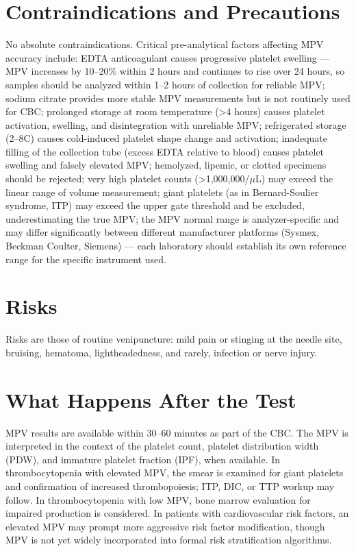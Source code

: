 \section*{Contraindications and Precautions}
No absolute contraindications. Critical pre-analytical factors affecting MPV accuracy include: EDTA anticoagulant causes progressive platelet swelling --- MPV increases by 10--20\% within 2 hours and continues to rise over 24 hours, so samples should be analyzed within 1--2 hours of collection for reliable MPV; sodium citrate provides more stable MPV measurements but is not routinely used for CBC; prolonged storage at room temperature (>4 hours) causes platelet activation, swelling, and disintegration with unreliable MPV; refrigerated storage (2--8\textdegree{}C) causes cold-induced platelet shape change and activation; inadequate filling of the collection tube (excess EDTA relative to blood) causes platelet swelling and falsely elevated MPV; hemolyzed, lipemic, or clotted specimens should be rejected; very high platelet counts (>1,000,000/$\mu$L) may exceed the linear range of volume measurement; giant platelets (as in Bernard-Soulier syndrome, ITP) may exceed the upper gate threshold and be excluded, underestimating the true MPV; the MPV normal range is analyzer-specific and may differ significantly between different manufacturer platforms (Sysmex, Beckman Coulter, Siemens) --- each laboratory should establish its own reference range for the specific instrument used.

\section*{Risks}
Risks are those of routine venipuncture: mild pain or stinging at the needle site, bruising, hematoma, lightheadedness, and rarely, infection or nerve injury.

\section*{What Happens After the Test}
MPV results are available within 30--60 minutes as part of the CBC. The MPV is interpreted in the context of the platelet count, platelet distribution width (PDW), and immature platelet fraction (IPF), when available. In thrombocytopenia with elevated MPV, the smear is examined for giant platelets and confirmation of increased thrombopoiesis; ITP, DIC, or TTP workup may follow. In thrombocytopenia with low MPV, bone marrow evaluation for impaired production is considered. In patients with cardiovascular risk factors, an elevated MPV may prompt more aggressive risk factor modification, though MPV is not yet widely incorporated into formal risk stratification algorithms.

